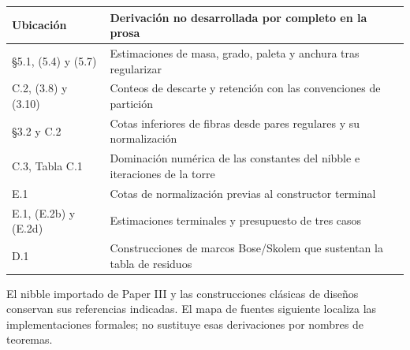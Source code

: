 \documentclass[spanish,11pt,a4paper]{article}
\newcounter{none}
\begin{document}

{\def\LTcaptype{none} %
\begin{longtable}[c]{@{}
  >{\raggedright\arraybackslash}p{}
  >{\raggedright\arraybackslash}p{}@{}}
\toprule\noalign{}
\begin{minipage}[b]{\linewidth}\raggedright
Ubicación
\end{minipage} & \begin{minipage}[b]{\linewidth}\raggedright
Derivación no desarrollada por completo en la prosa
\end{minipage} \\
\midrule\noalign{}
\endhead
\bottomrule\noalign{}
\endlastfoot
§5.1, (5.4) y (5.7) & Estimaciones de masa, grado, paleta y anchura tras regularizar \\
C.2, (3.8) y (3.10) & Conteos de descarte y retención con las convenciones de partición \\
§3.2 y C.2 & Cotas inferiores de fibras desde pares regulares y su normalización \\
C.3, Tabla C.1 & Dominación numérica de las constantes del nibble e iteraciones de la torre \\
E.1 & Cotas de normalización previas al constructor terminal \\
E.1, (E.2b) y (E.2d) & Estimaciones terminales y presupuesto de tres casos \\
D.1 & Construcciones de marcos Bose/Skolem que sustentan la tabla de residuos \\
\end{longtable}
}

El nibble importado de Paper III y las construcciones clásicas de diseños conservan sus referencias indicadas. El mapa de fuentes siguiente localiza las implementaciones formales; no sustituye esas derivaciones por nombres de teoremas.
\end{document}
